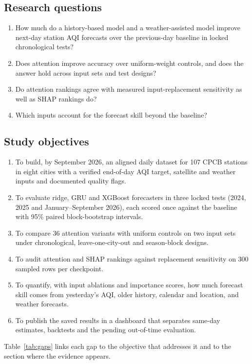 \documentclass[pdflatex,sn-mathphys-num]{sn-jnl}
\begin{document}
\subsection{Research questions}
\begin{enumerate}
\item[RQ1.] How much do a history-based model and a weather-assisted model improve next-day station AQI forecasts over the previous-day baseline in locked chronological tests?
\item[RQ2.] Does attention improve accuracy over uniform-weight controls, and does the answer hold across input sets and test designs?
\item[RQ3.] Do attention rankings agree with measured input-replacement sensitivity as well as SHAP rankings do?
\item[RQ4.] Which inputs account for the forecast skill beyond the baseline?
\end{enumerate}

\subsection{Study objectives}
\begin{enumerate}
\item To build, by September 2026, an aligned daily dataset for 107 CPCB stations in eight cities with a verified end-of-day AQI target, satellite and weather inputs and documented quality flags.
\item To evaluate ridge, GRU and XGBoost forecasters in three locked tests (2024, 2025 and January--September 2026), each scored once against the baseline with 95\% paired block-bootstrap intervals.
\item To compare 36 attention variants with uniform controls on two input sets under chronological, leave-one-city-out and season-block designs.
\item To audit attention and SHAP rankings against replacement sensitivity on 300 sampled rows per checkpoint.
\item To quantify, with input ablations and importance scores, how much forecast skill comes from yesterday's AQI, older history, calendar and location, and weather forecasts.
\item To publish the saved results in a dashboard that separates same-day estimates, backtests and the pending out-of-time evaluation.
\end{enumerate}
Table~\ref{tab:gaps} links each gap to the objective that addresses it and to the section where the evidence appears.
\end{document}
